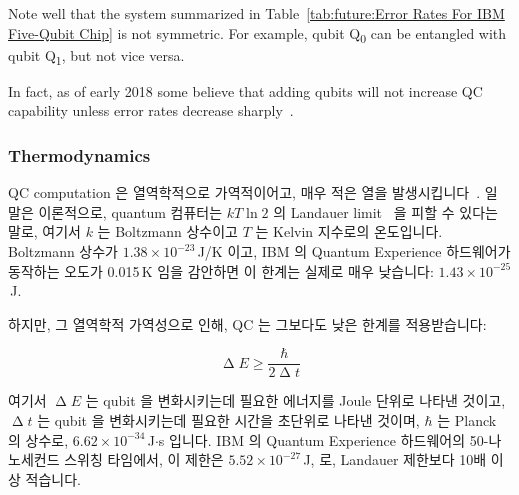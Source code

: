 Note well that the system summarized in
Table~\ref{tab:future:Error Rates For IBM Five-Qubit Chip}
is not symmetric.
For example, qubit Q\textsubscript{0} can be entangled with
qubit Q\textsubscript{1}, but not vice versa.

In fact, as of early 2018 some believe that adding qubits will not
increase QC capability unless error rates decrease
sharply~\cite{IBMResearch2018QuantumVolume,TheEconomist2018QualityOverQuantity}.
\fi

\subsubsection{Thermodynamics}
\label{sec:future:Thermodynamics}

QC computation 은 열역학적으로 가역적이어고, 매우 적은 열을
발생시킵니다~\cite{Bennett:1973:LRC:1664562.1664568,RichardFeynman1986QuantumMechanicalComputers}.
일 말은 이론적으로, quantum 컴퓨터는 $kT \ln 2$ 의 Landauer
limit~\cite{Landauer:1961:IHG:1661184.1661186} 을 피할 수 있다는 말로, 여기서
$k$ 는 Boltzmann 상수이고 $T$ 는 Kelvin 지수로의 온도입니다.
Boltzmann 상수가 $1.38 \times 10^{-23}$\,J/K 이고, IBM 의 Quantum Experience
하드웨어가 동작하는 오도가 0.015\,K 임을 감안하면 이 한계는 실제로 매우
낮습니다: $1.43 \times 10^{-25}$\,J.

하지만, 그 열역학적 가역성으로 인해, QC 는 그보다도 낮은 한계를 적용받습니다:

\begin{equation}
	\upDelta E \geq \frac{\hbar}{2 \upDelta t}
\end{equation}

여기서 $\upDelta E$ 는 qubit 을 변화시키는데 필요한 에너지를 Joule 단위로
나타낸 것이고, $\upDelta t$ 는 qubit 을 변화시키는데 필요한 시간을 초단위로
나타낸
것이며, $\hbar$ 는 Planck 의 상수로, $6.62 \times 10^{-34}$\,J$\cdot$s 입니다.
IBM 의 Quantum Experience 하드웨어의 50-나노세컨드 스위칭 타임에서, 이 제한은
$5.52 \times 10^{-27}$\,J, 로, Landauer 제한보다 10배 이상 적습니다.

